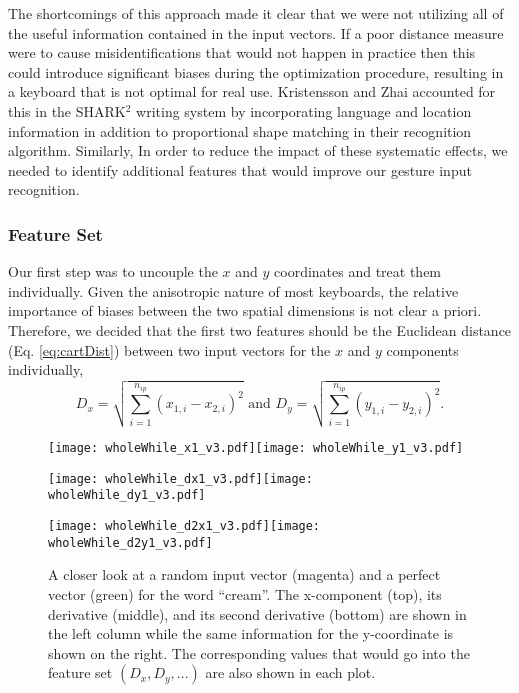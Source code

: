 \documentclass[final,1p,times,authoryear]{elsarticle}
\begin{document}
The shortcomings of this approach made it clear that we were not utilizing all of the useful information contained in the input vectors.
If a poor distance measure were to cause misidentifications that would not happen in practice then this could introduce significant biases during the optimization procedure, resulting in a keyboard that is not optimal for real use.
Kristensson and Zhai accounted for this in the SHARK$^2$ writing system by incorporating language and location information in addition to proportional shape matching in their recognition algorithm.
Similarly, In order to reduce the impact of these systematic effects, we needed to identify additional features that would improve our gesture input recognition.

\subsubsection{Feature Set}
Our first step was to uncouple the $x$ and $y$ coordinates and treat
them individually. Given the anisotropic nature of most keyboards, the
relative importance of biases between the two spatial dimensions is
not clear a priori. Therefore, we decided that the first two features
should be the Euclidean distance (Eq. \ref{eq:cartDist})
between two input vectors for the $x$ and $y$ components individually,
\begin{equation}
D_{x}=\sqrt{\sum_{i=1}^{n_{ip}}(x_{1,i}-x_{2,i})^{2}}\textrm{{\ \ and\ \ }}D_{y}=\sqrt{{\sum_{i=1}^{n_{ip}}(y_{1,i}-y_{2,i})^{2}}}.\label{eq:DxDy}
\end{equation}

\begin{figure}[t]
\begin{centering}
\texttt{[image: wholeWhile\_x1\_v3.pdf]}\texttt{[image: wholeWhile\_y1\_v3.pdf]}
\par\end{centering}
\begin{centering}
\texttt{[image: wholeWhile\_dx1\_v3.pdf]}\texttt{[image: wholeWhile\_dy1\_v3.pdf]}
\par\end{centering}
\begin{centering}
\texttt{[image: wholeWhile\_d2x1\_v3.pdf]}\texttt{[image: wholeWhile\_d2y1\_v3.pdf]}
\par\end{centering}
\medskip{}
\protect\caption{A closer look at a random input vector (magenta) and a perfect vector
(green) for the word ``cream''. The x-component (top), its derivative
(middle), and its second derivative (bottom) are shown in the left
column while the same information for the y-coordinate is shown on
the right. The corresponding values that would go into the feature
set $(D_{x},D_{y},...)$ are also shown in each plot.\label{fig:A-closer-look}}
\end{figure}
\end{document}

